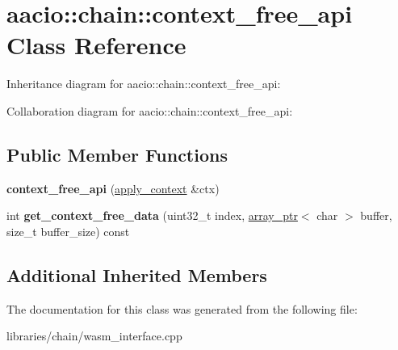 \hypertarget{classaacio_1_1chain_1_1context__free__api}{}\section{aacio\+:\+:chain\+:\+:context\+\_\+free\+\_\+api Class Reference}
\label{classaacio_1_1chain_1_1context__free__api}


Inheritance diagram for aacio\+:\+:chain\+:\+:context\+\_\+free\+\_\+api\+:


Collaboration diagram for aacio\+:\+:chain\+:\+:context\+\_\+free\+\_\+api\+:
\subsection*{Public Member Functions}
\begin{DoxyCompactItemize}
\item 
\mbox{\label{classaacio_1_1chain_1_1context__free__api_aa548b02898134ee58c17a3f73745d9f6}} 
{\bfseries context\+\_\+free\+\_\+api} (\mbox{\hyperlink{classaacio_1_1chain_1_1apply__context}{apply\+\_\+context}} \&ctx)
\item 
\mbox{\label{classaacio_1_1chain_1_1context__free__api_a6ae396e8d9f3225e053d2a980f55bdee}} 
int {\bfseries get\+\_\+context\+\_\+free\+\_\+data} (uint32\+\_\+t index, \mbox{\hyperlink{structaacio_1_1chain_1_1array__ptr}{array\+\_\+ptr}}$<$ char $>$ buffer, size\+\_\+t buffer\+\_\+size) const
\end{DoxyCompactItemize}
\subsection*{Additional Inherited Members}


The documentation for this class was generated from the following file\+:\begin{DoxyCompactItemize}
\item 
libraries/chain/wasm\+\_\+interface.\+cpp\end{DoxyCompactItemize}
